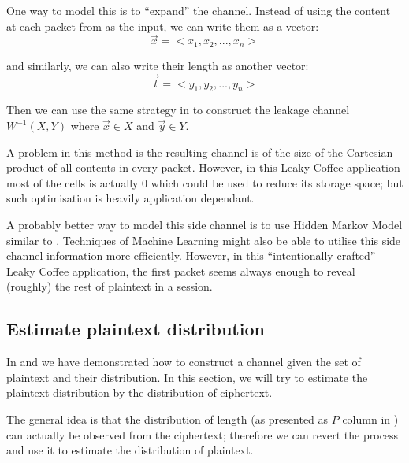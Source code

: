 One way to model this is to “expand” the channel. Instead of using the content at each packet from as the input, we can write them as a vector:
\begin{equation*}
\vec{x} = <x_1, x_2, ..., x_n>
\end{equation*}

and similarly, we can also write their length as another vector:
\begin{equation*}
\vec{l} = <y_1, y_2, ..., y_n>
\end{equation*}

Then we can use the same strategy in  to construct the leakage channel $W^{-1}(X, Y)$ where $\vec{x} \in X$ and $\vec{y} \in Y$. 

A problem in this method is the resulting channel is of the size of the Cartesian product of all contents in every packet. However, in this Leaky Coffee application most of the cells is actually $0$ which could be used to reduce its storage space; but such optimisation is heavily application dependant.

A probably better way to model this side channel is to use Hidden Markov Model\cite{baum1966} similar to \cite{Danezis_trafficanalysis}. Techniques of Machine Learning might also be able to utilise this side channel information more efficiently. However, in this “intentionally crafted” Leaky Coffee application, the first packet seems always enough to reveal (roughly) the rest of plaintext in a session.

\subsection{Estimate plaintext distribution}
In  and  we have demonstrated how to construct a channel given the set of plaintext and their distribution. In this section, we will try to estimate the plaintext distribution by the distribution of ciphertext.

The general idea is that the distribution of length (as presented as $P$ column in ) can actually be observed from the ciphertext; therefore we can revert the process and use it to estimate the distribution of plaintext.

